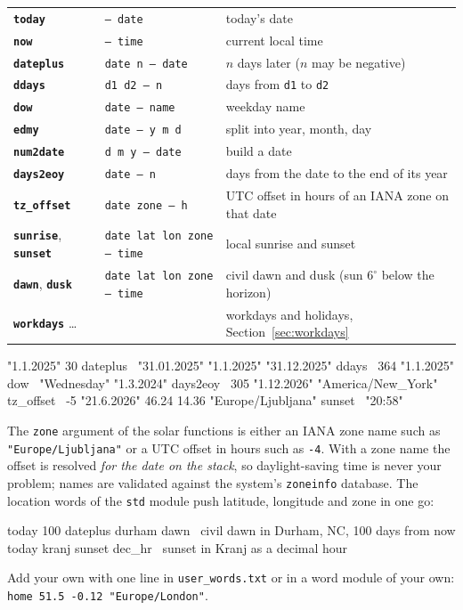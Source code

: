 \documentclass[11pt,letterpaper]{article}
\newcommand{\code}[1]{\texttt{#1}}
\newcommand{\cmd}[1]{\texttt{\textbf{#1}}}
\newcommand{\stk}[1]{\texttt{#1}}
\begin{document}
\begin{center}
\begin{tabular}{@{}llp{}@{}}
\toprule
\cmd{today}     & \stk{-- date}      & today's date \\
\cmd{now}       & \stk{-- time}      & current local time \\
\cmd{dateplus}  & \stk{date n -- date} & $n$ days later ($n$ may be negative) \\
\cmd{ddays}     & \stk{d1 d2 -- n}   & days from \code{d1} to \code{d2} \\
\cmd{dow}       & \stk{date -- name} & weekday name \\
\cmd{edmy}      & \stk{date -- y m d} & split into year, month, day \\
\cmd{num2date}  & \stk{d m y -- date} & build a date \\
\cmd{days2eoy}  & \stk{date -- n}    & days from the date to the end of its year \\
\cmd{tz\_offset} & \stk{date zone -- h} & UTC offset in hours of an IANA zone on that date \\
\cmd{sunrise}, \cmd{sunset} & \stk{date lat lon zone -- time} & local sunrise and sunset \\
\cmd{dawn}, \cmd{dusk} & \stk{date lat lon zone -- time} & civil dawn and dusk (sun $6^\circ$ below the horizon) \\
\cmd{workdays} \ldots & & workdays and holidays, Section~\ref{sec:workdays} \\
\bottomrule
\end{tabular}
\end{center}
\begin{rpn}
"1.1.2025" 30 dateplus         \ "31.01.2025"
"1.1.2025" "31.12.2025" ddays  \ 364
"1.1.2025" dow                 \ "Wednesday"
"1.3.2024" days2eoy            \ 305
"1.12.2026" "America/New_York" tz_offset        \ -5
"21.6.2026" 46.24 14.36 "Europe/Ljubljana" sunset   \ "20:58"
\end{rpn}
The \code{zone} argument of the solar functions is either an IANA zone name such as \code{"Europe/Ljubljana"} or a UTC offset in hours such as \code{-4}. With a zone name the offset is resolved \emph{for the date on the stack}, so daylight-saving time is never your problem; names are validated against the system's \code{zoneinfo} database. The location words of the \code{std} module push latitude, longitude and zone in one go:
\begin{rpn}
today 100 dateplus durham dawn      \ civil dawn in Durham, NC, 100 days from now
today kranj sunset dec_hr           \ sunset in Kranj as a decimal hour
\end{rpn}
Add your own with one line in \code{user\_words.txt} or in a word module of your own: \code{home 51.5 -0.12 "Europe/London"}.
\end{document}

